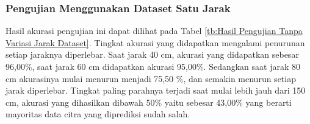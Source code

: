 \subsubsection{Pengujian Menggunakan Dataset Satu Jarak}
\label{subsubsec:Pengujian Menggunakan Dataset Satu Jarak}

Hasil akurasi pengujian ini dapat dilihat pada Tabel \ref{tb:Hasil Pengujian Tanpa Variasi Jarak Dataset}. Tingkat akurasi yang didapatkan mengalami penurunan setiap jaraknya diperlebar. Saat jarak 40 cm, akurasi yang didapatkan sebesar 96,00\%, saat jarak 60 cm didapatkan akurasi 95,00\%. Sedangkan saat jarak 80 cm akurasinya mulai menurun menjadi 75,50 \%, dan semakin menurun setiap jarak diperlebar. Tingkat paling parahnya terjadi saat mulai lebih jauh dari 150 cm, akurasi yang dihasilkan dibawah 50\% yaitu sebesar 43,00\% yang berarti mayoritas data citra yang diprediksi sudah salah.


